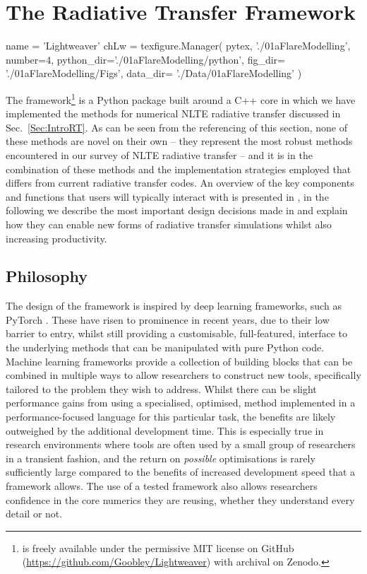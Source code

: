 \chapter{The \Lw{} Radiative Transfer Framework}\label{Chap:Lw}
\begin{pycode}[Lw]
name = 'Lightweaver'
chLw = texfigure.Manager(
    pytex,
    './01aFlareModelling',
    number=4,
    python_dir='./01aFlareModelling/python',
    fig_dir=   './01aFlareModelling/Figs',
    data_dir=  './Data/01aFlareModelling'
)
\end{pycode}


The \Lw{} framework\footnote{\Lw{} is freely available under the permissive MIT license on GitHub (\url{https://github.com/Goobley/Lightweaver}) with archival on Zenodo.} \citep{Osborne2021, LightweaverZenodo} is a Python package built around a C++ core in which we have implemented the methods for numerical NLTE radiative transfer discussed in Sec.~\ref{Sec:IntroRT}.
As can be seen from the referencing of this section, none of these methods are novel on their own -- they represent the most robust methods encountered in our survey of NLTE radiative transfer -- and it is in the combination of these methods and the implementation strategies employed that \Lw{} differs from current \Sota{} radiative transfer codes.
An overview of the key components and functions that users will typically interact with is presented in \citet{Osborne2021}, in the following we describe the most important design decisions made in \Lw{} and explain how they can enable new forms of radiative transfer simulations whilst also increasing productivity.

\section{Philosophy}

The design of the \Lw{} framework is inspired by deep learning frameworks, such as PyTorch \citep{PyTorch}.
These have risen to prominence in recent years, due to their low barrier to entry, whilst still providing a customisable, full-featured, interface to the underlying methods that can be manipulated with pure Python code.
Machine learning frameworks provide a collection of building blocks that can be combined in multiple ways to allow researchers to construct new tools, specifically tailored to the problem they wish to address.
Whilst there can be slight performance gains from using a specialised, optimised, \Sota{} method implemented in a performance-focused language for this particular task, the benefits are likely outweighed by the additional development time.
This is especially true in research environments where tools are often used by a small group of researchers in a transient fashion, and the return on \emph{possible} optimisations is rarely sufficiently large compared to the benefits of increased development speed that a framework allows.
The use of a tested framework also allows researchers confidence in the core numerics they are reusing, whether they understand every detail or not.

